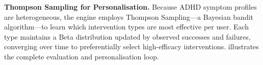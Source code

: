 \textbf{Thompson Sampling for Personalisation.} Because ADHD symptom profiles are heterogeneous, the engine employs Thompson Sampling---a Bayesian bandit algorithm---to learn which intervention types are most effective per user. Each type maintains a Beta distribution updated by observed successes and failures, converging over time to preferentially select high-efficacy interventions.  illustrates the complete evaluation and personalisation loop.


